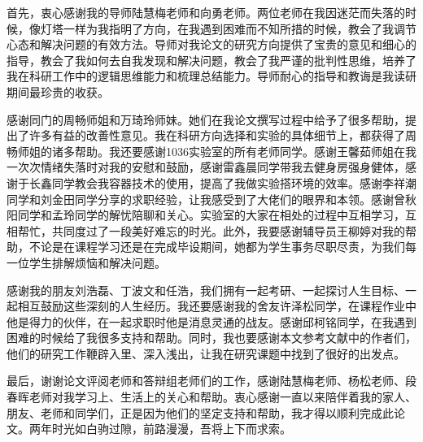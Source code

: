 
\begin{thanks}

首先，衷心感谢我的导师陆慧梅老师和向勇老师。两位老师在我因迷茫而失落的时候，像灯塔一样为我指明了方向，在我遇到困难而不知所措的时候，教会了我调节心态和解决问题的有效方法。导师对我论文的研究方向提供了宝贵的意见和细心的指导，教会了我如何去自我发现和解决问题，教会了我严谨的批判性思维，培养了我在科研工作中的逻辑思维能力和梳理总结能力。导师耐心的指导和教诲是我读研期间最珍贵的收获。

感谢同门的周畅师姐和万琦玲师妹。她们在我论文撰写过程中给予了很多帮助，提出了许多有益的改善性意见。我在科研方向选择和实验的具体细节上，都获得了周畅师姐的诸多帮助。我还要感谢1036实验室的所有老师同学。感谢王馨茹师姐在我一次次情绪失落时对我的安慰和鼓励，感谢雷鑫晨同学带我去健身房强身健体，感谢于长鑫同学教会我容器技术的使用，提高了我做实验搭环境的效率。感谢李祥潮同学和刘金田同学分享的求职经验，让我感受到了大佬们的眼界和本领。感谢曾秋阳同学和孟玲同学的解忧陪聊和关心。实验室的大家在相处的过程中互相学习，互相帮忙，共同度过了一段美好难忘的时光。此外，我要感谢辅导员王柳婷对我的帮助，不论是在课程学习还是在完成毕设期间，她都为学生事务尽职尽责，为我们每一位学生排解烦恼和解决问题。

感谢我的朋友刘浩磊、丁波文和任浩，我们拥有一起考研、一起探讨人生目标、一起相互鼓励这些深刻的人生经历。我还要感谢我的舍友许泽松同学，在课程作业中他是得力的伙伴，在一起求职时他是消息灵通的战友。感谢邱柯铭同学，在我遇到困难的时候给了我很多支持和帮助。同时，我也要感谢本文参考文献中的作者们，他们的研究工作鞭辟入里、深入浅出，让我在研究课题中找到了很好的出发点。

最后，谢谢论文评阅老师和答辩组老师们的工作，感谢陆慧梅老师、杨松老师、段春晖老师对我学习上、生活上的关心和帮助。衷心感谢一直以来陪伴着我的家人、朋友、老师和同学们，正是因为他们的坚定支持和帮助，我才得以顺利完成此论文。两年时光如白驹过隙，前路漫漫，吾将上下而求索。

\end{thanks}
